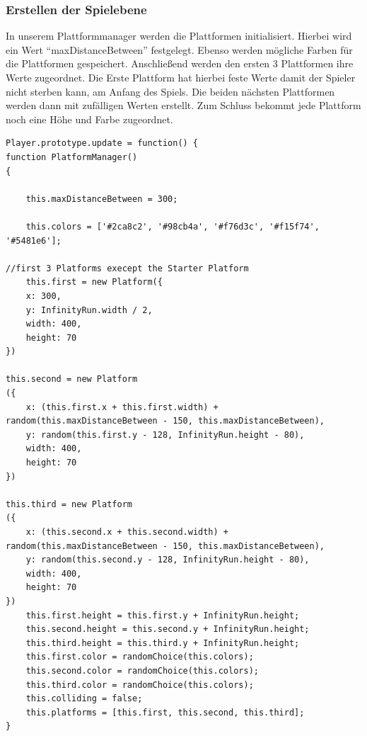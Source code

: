 \subsubsection{Erstellen der Spielebene}
In unserem Plattformmanager werden die Plattformen initialisiert. Hierbei wird ein Wert ``maxDistanceBetween'' festgelegt. Ebenso werden mögliche Farben für die Plattformen gespeichert. Anschließend werden den ersten 3 Plattformen ihre Werte zugeordnet. Die Erste Plattform hat hierbei feste Werte damit der Spieler nicht sterben kann, am Anfang des Spiels. Die beiden nächsten Plattformen werden dann mit zufälligen Werten erstellt. Zum Schluss bekommt jede Plattform noch eine Höhe und Farbe zugeordnet.
\lstset{language=java}
\begin{lstlisting}[frame=single]
Player.prototype.update = function() {
function PlatformManager() 
{

	this.maxDistanceBetween = 300;

	this.colors = ['#2ca8c2', '#98cb4a', '#f76d3c', '#f15f74', '#5481e6'];

//first 3 Platforms execept the Starter Platform
	this.first = new Platform({
	x: 300,
	y: InfinityRun.width / 2,
	width: 400,
	height: 70
})

this.second = new Platform
({
	x: (this.first.x + this.first.width) + random(this.maxDistanceBetween - 150, this.maxDistanceBetween),
	y: random(this.first.y - 128, InfinityRun.height - 80),
	width: 400,
	height: 70
})

this.third = new Platform
({
	x: (this.second.x + this.second.width) + random(this.maxDistanceBetween - 150, this.maxDistanceBetween),
	y: random(this.second.y - 128, InfinityRun.height - 80),
	width: 400,
	height: 70
})
	this.first.height = this.first.y + InfinityRun.height;
	this.second.height = this.second.y + InfinityRun.height;
	this.third.height = this.third.y + InfinityRun.height;
	this.first.color = randomChoice(this.colors);
	this.second.color = randomChoice(this.colors);
	this.third.color = randomChoice(this.colors);
	this.colliding = false;
	this.platforms = [this.first, this.second, this.third];
}
\end{lstlisting}
